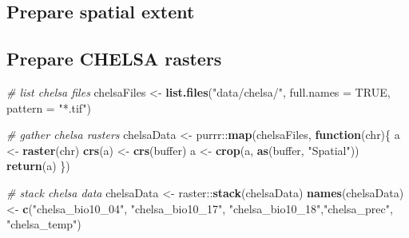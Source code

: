 \documentclass[]{article}
\newenvironment{Shaded}{}{}
\newcommand{\CommentTok}[1]{\textcolor[rgb]{0.38,0.63,0.69}{\textit{#1}}}
\newcommand{\ControlFlowTok}[1]{\textcolor[rgb]{0.00,0.44,0.13}{\textbf{#1}}}
\newcommand{\DataTypeTok}[1]{\textcolor[rgb]{0.56,0.13,0.00}{#1}}
\newcommand{\DecValTok}[1]{\textcolor[rgb]{0.25,0.63,0.44}{#1}}
\newcommand{\FloatTok}[1]{\textcolor[rgb]{0.25,0.63,0.44}{#1}}
\newcommand{\KeywordTok}[1]{\textcolor[rgb]{0.00,0.44,0.13}{\textbf{#1}}}
\newcommand{\NormalTok}[1]{#1}
\newcommand{\OperatorTok}[1]{\textcolor[rgb]{0.40,0.40,0.40}{#1}}
\newcommand{\OtherTok}[1]{\textcolor[rgb]{0.00,0.44,0.13}{#1}}
\newcommand{\StringTok}[1]{\textcolor[rgb]{0.25,0.44,0.63}{#1}}
\begin{document}
\hypertarget{prepare-spatial-extent}{%
\subsection{Prepare spatial extent}\label{prepare-spatial-extent}}

\begin{Shaded}
\end{Shaded}

\hypertarget{prepare-chelsa-rasters}{%
\subsection{Prepare CHELSA rasters}\label{prepare-chelsa-rasters}}

\begin{Shaded}
\begin{Highlighting}[]
\CommentTok{# list chelsa files}
\NormalTok{chelsaFiles <-}\StringTok{ }\KeywordTok{list.files}\NormalTok{(}\StringTok{"data/chelsa/"}\NormalTok{, }\DataTypeTok{full.names =} \OtherTok{TRUE}\NormalTok{, }\DataTypeTok{pattern =} \StringTok{"*.tif"}\NormalTok{)}

\CommentTok{# gather chelsa rasters}
\NormalTok{chelsaData <-}\StringTok{ }\NormalTok{purrr}\OperatorTok{::}\KeywordTok{map}\NormalTok{(chelsaFiles, }\ControlFlowTok{function}\NormalTok{(chr)\{}
\NormalTok{  a <-}\StringTok{ }\KeywordTok{raster}\NormalTok{(chr)}
  \KeywordTok{crs}\NormalTok{(a) <-}\StringTok{ }\KeywordTok{crs}\NormalTok{(buffer)}
\NormalTok{  a <-}\StringTok{ }\KeywordTok{crop}\NormalTok{(a, }\KeywordTok{as}\NormalTok{(buffer, }\StringTok{"Spatial"}\NormalTok{))}
  \KeywordTok{return}\NormalTok{(a)}
\NormalTok{\})}

\CommentTok{# stack chelsa data}
\NormalTok{chelsaData <-}\StringTok{ }\NormalTok{raster}\OperatorTok{::}\KeywordTok{stack}\NormalTok{(chelsaData)}
\KeywordTok{names}\NormalTok{(chelsaData) <-}\StringTok{ }\KeywordTok{c}\NormalTok{(}\StringTok{"chelsa_bio10_04"}\NormalTok{, }\StringTok{"chelsa_bio10_17"}\NormalTok{, }\StringTok{"chelsa_bio10_18"}\NormalTok{,}\StringTok{"chelsa_prec"}\NormalTok{, }\StringTok{"chelsa_temp"}\NormalTok{)}
\end{Highlighting}
\end{Shaded}
\end{document}
